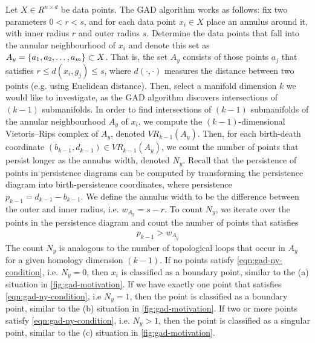 Let $X \in R^{n \times d}$ be data points. The GAD algorithm works as follows: fix two parameters $0 < r < s$, and for each data point $x_i \in X$ place an annulus around it, with inner radius $r$ and outer radius $s$. Determine the data points that fall into the annular neighbourhood of $x_i$ and denote this set as $A_y = \left\{a_1, a_2, \ldots, a_m\right\} \subset X$. That is, the set $A_y$ consists of those points $a_j$ that satisfies $r \leq d(x_i, g_j) \leq s$, where $d(\cdot, \cdot)$ measures the distance between two points (e.g. using Euclidean distance). Then, select a manifold dimension $k$ we would like to investigate, as the GAD algorithm discovers intersections of $(k-1)$ submanifolds. In order to find intersections of $(k-1)$ submanifolds of the annular neighbourhood $A_y$ of $x_i$, we compute the $(k-1)$-dimensional Vietoris–Rips complex of $A_y$, denoted $VR_{k-1}(A_y)$. Then, for each birth-death coordinate $(b_{k-1}, d_{k-1}) \in VR_{k-1}(A_y)$, we count the number of points that persist longer as the annulus width, denoted $N_y$. Recall that the persistence of points in persistence diagrams can be computed by transforming the persistence diagram into birth-persistence coordinates, where persistence $p_{k-1} = d_{k-1} - b_{k-1}$. We define the annulus width to be the difference between the outer and inner radius, i.e. $w_{A_y} = s - r$. To count $N_y$, we iterate over the points in the persistence diagram and count the number of points that satisfies
\begin{align}
    p_{k-1} > w_{A_y}
    \label{eqn:gad-ny-condition}
\end{align}
The count $N_y$ is analogous to the number of topological loops that occur in $A_y$ for a given homology dimension $(k-1)$. If no points satisfy \cref{eqn:gad-ny-condition}, i.e. $N_y=0$, then $x_i$ is classified as a boundary point, similar to the (a) situation in \cref{fig:gad-motivation}. If we have exactly one point that satisfies \cref{eqn:gad-ny-condition}, i.e $N_y=1$, then the point is classified as a boundary point, similar to the (b) situation in \cref{fig:gad-motivation}. If two or more points satisfy \cref{eqn:gad-ny-condition}, i.e. $N_y>1$, then the point is classified as a singular point, similar to the (c) situation in \cref{fig:gad-motivation}.
